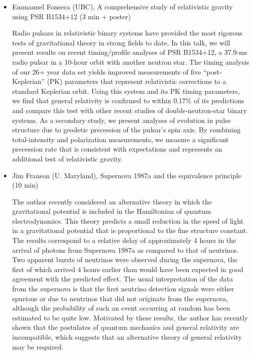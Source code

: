 \documentclass[letterpaper,12pt]{article}
\newcommand{\talk}[2]{{\fontspec{Lato Bold} #1,} {\fontspec{Lato Light Italic} #2}}
\begin{document}
\begin{itemize}
\item \talk{Emmanuel Fonseca (UBC)}{A comprehensive study of relativistic gravity using PSR B1534+12 (3 min + poster)}

Radio pulsars in relativistic binary systems have provided the most rigorous tests of gravitational theory in strong fields to date. In this talk, we will present results on recent timing/profile analyses of PSR B1534+12, a 37.9-ms radio pulsar in a 10-hour orbit with another neutron star. The timing analysis of our 26+ year data set yields improved measurements of five ``post-Keplerian'' (PK) parameters that represent relativistic corrections to a standard Keplerian orbit. Using this system and its PK timing parameters, we find that general relativity is confirmed to within 0.17\% of its predictions and compare this test with other recent studies of double-neutron-star binary systems. As a secondary study, we present analyses of evolution in pulse structure due to geodetic precession of the pulsar's spin axis. By combining total-intensity and polarization measurements, we measure a significant precession rate that is consistent with expectations and represents an additional test of relativistic gravity. 

\item \talk{Jim Franson (U. Maryland)}{Supernova 1987a and the equivalence principle (10 min)}

The author recently considered an alternative theory in which the gravitational potential is included in the Hamiltonian of quantum electrodynamics. This theory predicts a small reduction in the speed of light in a gravitational potential that is proportional to the fine structure constant. The results correspond to a relative delay of approximately 4 hours in the arrival of photons from Supernova 1987a as compared to that of neutrinos. Two apparent bursts of neutrinos were observed during the supernova, the first of which arrived 4 hours earlier than would have been expected in good agreement with the predicted effect. The usual interpretation of the data from the supernova is that the first neutrino detection signals were either spurious or due to neutrinos that did not originate from the supernova, although the probability of such an event occurring at random has been estimated to be quite low. Motivated by these results, the author has recently shown that the postulates of quantum mechanics and general relativity are incompatible, which suggests that an alternative theory of general relativity may be required.


\end{itemize}
\end{document}
